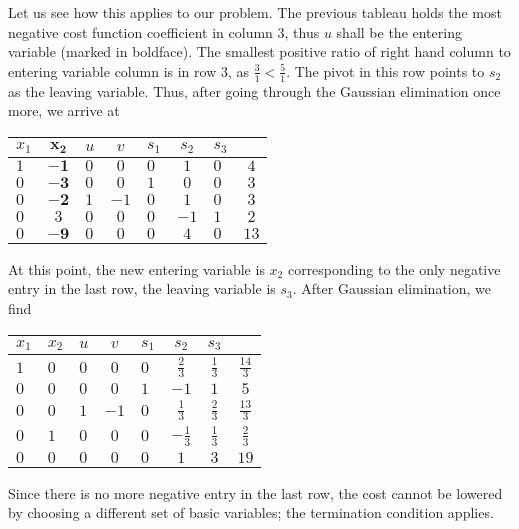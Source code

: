 \begin{enumerate}
	Let us see how this applies to our problem.  The previous tableau
	holds the most negative cost function coefficient in column $3$,
	thus $u$ shall be the entering variable (marked in boldface).  The
	smallest positive ratio of right hand column to entering variable
	column is in row $3$, as $\tfrac31<\tfrac51$.  The pivot in this row
	points to $s_2$ as the leaving variable.  Thus, after going through
	the Gaussian elimination once more, we arrive at
	\begin{center}
	\begin{tabular}{BcBcBcB|c}
	  $x_1$ & $\boldsymbol{x_2}$ & $u$ & $v$ & $s_1$ & $s_2$ & $s_3$ \\
	  \hline
	  $1$ & $\boldsymbol{-1}$ & $0$ & $0$ & $0$ & $1$ & $0$ & $4$ \\
	  $0$ & $\boldsymbol{-3}$ & $0$ & $0$ & $1$ & $0$ & $0$ & $3$ \\
	  $0$ & $\boldsymbol{-2}$ & $1$ & $-1$ & $0$ & $1$ & $0$ & $3$ \\
	  $\mathit{0}$ & $\boldsymbol{\mathit{3}}$ & $\mathit 0$ & $\mathit 0$ 
	      & $\mathit 0$ & $\mathit{-1}$ & $\mathit{1}$ & $\mathit 2$ \\
	  \hline
	  $0$ & $\boldsymbol{-9}$ & $0$ & $0$ & $0$ & $4$ & $0$ & $13$ 
	\end{tabular}
	\end{center}
	At this point, the new entering variable is $x_2$ corresponding to the
	only negative entry in the last row, the leaving variable is $s_3$.
	After Gaussian elimination, we find
	\begin{center}
	\begin{tabular}{BBBcBcc|c}
	  $x_1$ & $x_2$ & $u$ & $v$ & $s_1$ & $s_2$ & $s_3$ \\
	  \hline
	  $1$ & $0$ & $0$ & $0$ & $0$ & $\tfrac23$ & $\tfrac13$ & $\tfrac{14}3$ \\
	  $0$ & $0$ & $0$ & $0$ & $1$ & $-1$ & $1$ & $5$ \\
	  $0$ & $0$ & $1$ & $-1$ & $0$ & $\tfrac13$ & $\tfrac23$ & $\tfrac{13}3$ \\
	  $0$ & $1$ & $0$ & $0$ & $0$ & $-\tfrac13$ & $\tfrac13$ & $\tfrac23$ \\
	  \hline
	  $0$ & $0$ & $0$ & $0$ & $0$ & $1$ & $3$ & $19$ 
	\end{tabular}
	\end{center}
	Since there is no more negative entry in the last row, the cost cannot
	be lowered by choosing a different set of basic variables; the
	termination condition applies.


\end{enumerate}
